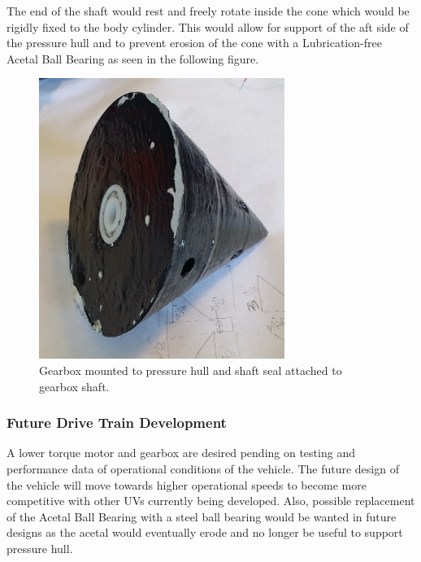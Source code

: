 \documentclass{report}
\begin{document}
The end of the shaft would rest and freely rotate inside the cone which would be rigidly fixed to the body cylinder. This would allow for support of the aft side of the pressure hull and to prevent erosion of the cone with a Lubrication-free Acetal Ball Bearing as seen in the following figure.
\begin{figure}[H]
\centering
\includegraphics[width=8cm]{cone}
\caption{Gearbox mounted to pressure hull and shaft seal attached to gearbox shaft.}
\end{figure}
\subsubsection{Future Drive Train Development}
A lower torque motor and gearbox are desired pending on testing and performance data of operational conditions of the vehicle.  The future design of the vehicle will move towards higher operational speeds to become more competitive with other UVs currently being developed.  Also, possible replacement of the Acetal Ball Bearing with a steel ball bearing would be wanted in future designs as the acetal would eventually erode and no longer be useful to support pressure hull.  
\end{document}
